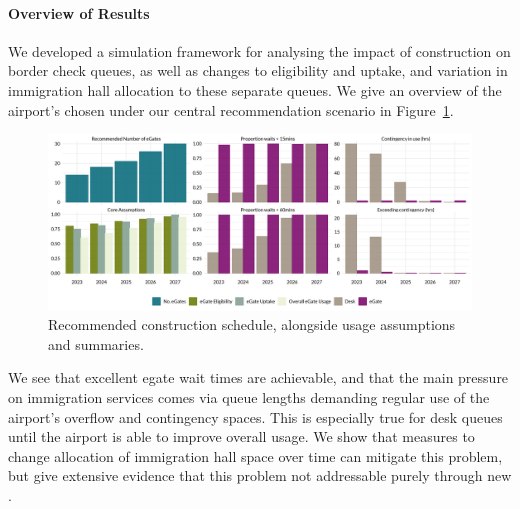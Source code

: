 \documentclass[10pt]{article}
\begin{document}
\paragraph{Overview of Results}
We developed a simulation framework for analysing the impact of  construction on border check queues, as well as changes to  eligibility and uptake, and variation in immigration hall allocation to these separate queues. We give an overview of the airport's chosen  under our central recommendation scenario in Figure~\ref{fig:core_rec_fig}.
\begin{figure}[!h]
    \centering
    \includegraphics[width=\textwidth]{figures/core_rec_fig.png}
     \caption{Recommended  construction schedule, alongside usage assumptions and  summaries.} \label{fig:core_rec_fig}
\end{figure}

\vspace{-5pt}
We see that excellent \gls{egate} wait times are achievable, and that the main pressure on immigration services comes via queue lengths demanding regular use of the airport's overflow and contingency spaces. This is especially true for desk queues until the airport is able to improve overall  usage. We show that measures to change allocation of immigration hall space over time can mitigate this problem, but give extensive evidence that this problem not addressable purely through new . 
\end{document}

